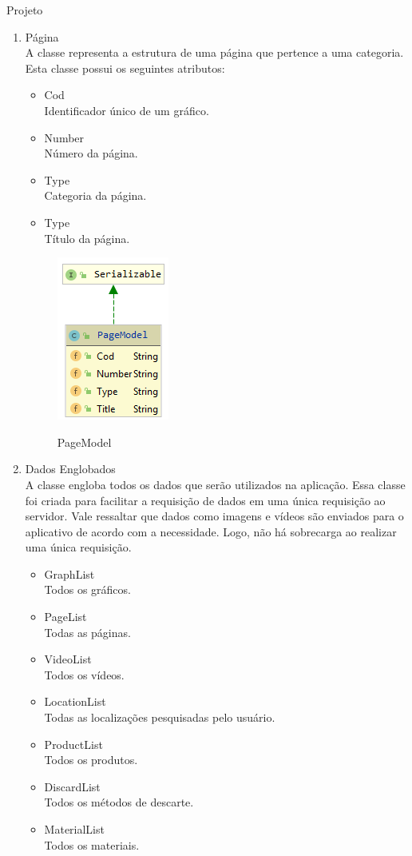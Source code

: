 \documentclass[
	12pt,				%
	openany,			%
	twoside,			%
	a4paper,			%
	english,			%
	french,				%
	spanish,			%
	brazil				%
	]{abntex2}
\begin{document}
\begin{chapter}{Projeto}
\begin{enumerate}
  \item{Página}   \\ A classe \textit{} representa a estrutura de uma página que pertence a uma categoria. Esta classe possui os seguintes atributos:
  \begin{itemize}
  \item{Cod}\\ Identificador único de um gráfico.
       \item{Number}\\Número da página.
         \item{Type}\\ Categoria da página.
          \item{Type}\\ Título da página.
\end{itemize}
\begin{figure}[h]
\centering
   \caption{PageModel}
   \includegraphics[scale=1.0]{media/PageModel.png}
     \label{fig:pageModel}
\end{figure}

\newpage
\item{Dados Englobados}   \\ A classe \textit{} engloba todos os dados que serão utilizados na aplicação. Essa classe foi criada para facilitar a requisição de dados em uma única requisição ao servidor. Vale ressaltar que dados como imagens e vídeos são enviados para o aplicativo de acordo com a necessidade. Logo, não há sobrecarga ao realizar uma única requisição.
\newline
  \begin{itemize}
  \item{GraphList}\\ Todos os gráficos.
       \item{PageList}\\  Todas as páginas.
         \item{VideoList}\\ Todos os vídeos.
         \item{LocationList}\\ Todas as localizações pesquisadas pelo usuário.
         \item{ProductList}\\  Todos os produtos.
         \item{DiscardList}\\ Todos os métodos de descarte.
         \item{MaterialList}\\  Todos os materiais.
         

\end{itemize}
\end{enumerate}
\end{chapter}
\end{document}

